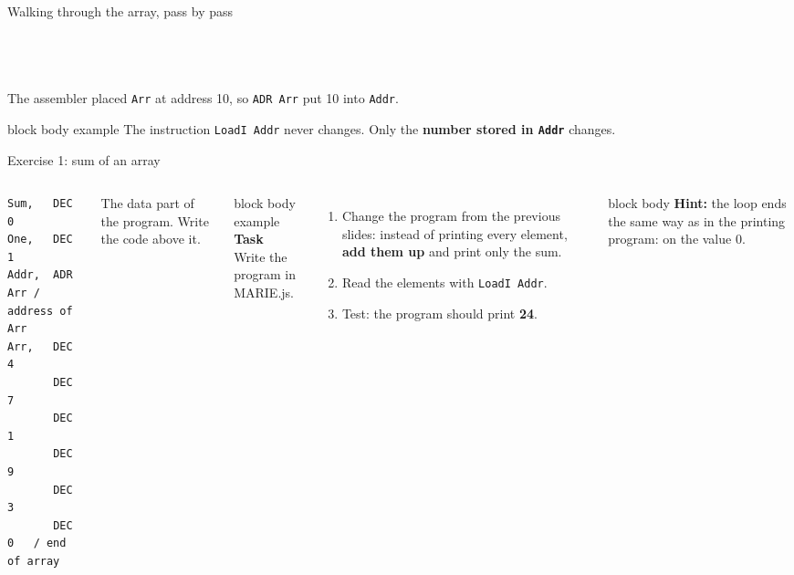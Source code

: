 \documentclass[aspectratio=169,10pt]{beamer}
\newcommand{\taskhead}[2]{%
  \begin{beamercolorbox}[rounded=true,sep=0.12cm,wd=\linewidth]{block body example}
    \small\textbf{#1}\\[0.04cm]
    \footnotesize #2
  \end{beamercolorbox}\vspace{0.1cm}}
\newcommand{\keymsg}[1]{%
  \begin{beamercolorbox}[rounded=true,sep=0.1cm,wd=\textwidth]{block body example}
    \centering\footnotesize #1
  \end{beamercolorbox}}
\begin{document}
\begin{frame}{Walking through the array, pass by pass}
\begin{columns}[c,onlytextwidth]
\begin{tabular}{cccc}
        \bottomrule
      \end{tabular}\\[0.15cm]
  \end{columns}
  \vfill
  \scriptsize\centering The assembler placed \texttt{Arr} at address 10, so \texttt{ADR Arr} put 10 into \texttt{Addr}.\par\vspace{0.05cm}
  \keymsg{The instruction \texttt{LoadI Addr} never changes. Only the \textbf{number stored in \texttt{Addr}} changes.}
\end{frame}

\begin{frame}[fragile]{Exercise 1: sum of an array}
  \begin{columns}[T,onlytextwidth]
\begin{lstlisting}[style=marie, numbers=none]
Sum,   DEC 0
One,   DEC 1
Addr,  ADR Arr / address of Arr
Arr,   DEC 4
       DEC 7
       DEC 1
       DEC 9
       DEC 3
       DEC 0   / end of array
\end{lstlisting}
      \scriptsize The data part of the program. Write the code above it.
      \taskhead{Task}{Write the program in MARIE.js.}
      \footnotesize
      \begin{enumerate}\setlength{\itemsep}{3pt}
        \item Change the program from the previous slides: instead of printing every element,
          \textbf{add them up} and print only the sum.
        \item Read the elements with \texttt{LoadI Addr}.
        \item Test: the program should print \textbf{24}.
      \end{enumerate}
      \vspace{0.05cm}
      \begin{beamercolorbox}[rounded=true,sep=0.1cm,wd=\linewidth]{block body}
        \scriptsize
        \textbf{Hint:} the loop ends the same way as in the printing program: on the value 0.
      \end{beamercolorbox}
  \end{columns}
\end{frame}
\end{document}
